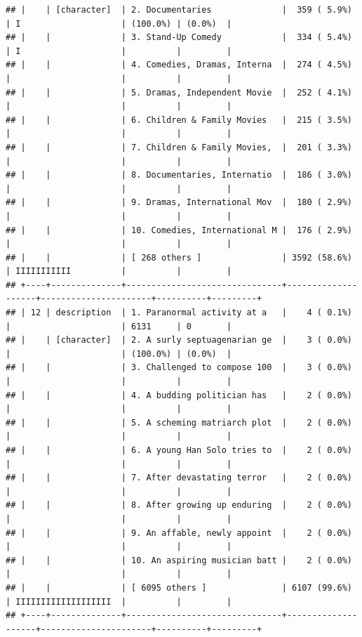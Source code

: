 \documentclass[11pt,preprint]{elsarticle}
\numberwithin{equation}{section}
\numberwithin{figure}{section}
\numberwithin{table}{section}
\begin{document}
\begin{verbatim}
## |    | [character]  | 2. Documentaries              |  359 ( 5.9%)       | I                    | (100.0%) | (0.0%)  |
## |    |              | 3. Stand-Up Comedy            |  334 ( 5.4%)       | I                    |          |         |
## |    |              | 4. Comedies, Dramas, Interna  |  274 ( 4.5%)       |                      |          |         |
## |    |              | 5. Dramas, Independent Movie  |  252 ( 4.1%)       |                      |          |         |
## |    |              | 6. Children & Family Movies   |  215 ( 3.5%)       |                      |          |         |
## |    |              | 7. Children & Family Movies,  |  201 ( 3.3%)       |                      |          |         |
## |    |              | 8. Documentaries, Internatio  |  186 ( 3.0%)       |                      |          |         |
## |    |              | 9. Dramas, International Mov  |  180 ( 2.9%)       |                      |          |         |
## |    |              | 10. Comedies, International M |  176 ( 2.9%)       |                      |          |         |
## |    |              | [ 268 others ]                | 3592 (58.6%)       | IIIIIIIIIII          |          |         |
## +----+--------------+-------------------------------+--------------------+----------------------+----------+---------+
## | 12 | description  | 1. Paranormal activity at a   |    4 ( 0.1%)       |                      | 6131     | 0       |
## |    | [character]  | 2. A surly septuagenarian ge  |    3 ( 0.0%)       |                      | (100.0%) | (0.0%)  |
## |    |              | 3. Challenged to compose 100  |    3 ( 0.0%)       |                      |          |         |
## |    |              | 4. A budding politician has   |    2 ( 0.0%)       |                      |          |         |
## |    |              | 5. A scheming matriarch plot  |    2 ( 0.0%)       |                      |          |         |
## |    |              | 6. A young Han Solo tries to  |    2 ( 0.0%)       |                      |          |         |
## |    |              | 7. After devastating terror   |    2 ( 0.0%)       |                      |          |         |
## |    |              | 8. After growing up enduring  |    2 ( 0.0%)       |                      |          |         |
## |    |              | 9. An affable, newly appoint  |    2 ( 0.0%)       |                      |          |         |
## |    |              | 10. An aspiring musician batt |    2 ( 0.0%)       |                      |          |         |
## |    |              | [ 6095 others ]               | 6107 (99.6%)       | IIIIIIIIIIIIIIIIIII  |          |         |
## +----+--------------+-------------------------------+--------------------+----------------------+----------+---------+
\end{verbatim}
\end{document}
